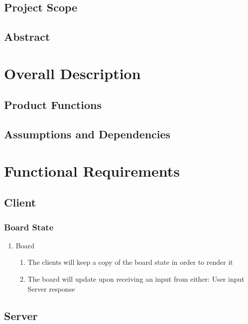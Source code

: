 \documentclass{scrreprt}
\begin{document}
\section{Project Scope}

\section{Abstract}

\chapter{Overall Description}

\section{Product Functions}

\section{Assumptions and Dependencies}

\chapter{Functional Requirements}

\section{Client}

\subsection{Board State}

\begin{enumerate}[label*=R\arabic*.]
	\item Board
	\begin{enumerate}[label*=\arabic*.]
  		\item The clients will keep a copy of the board state in order to render it
  		\item The board will update upon receiving an input from either:
  			\subitem User input
			\subitem Server response
	\end{enumerate}
\end{enumerate}

\section{Server}
\end{document}

